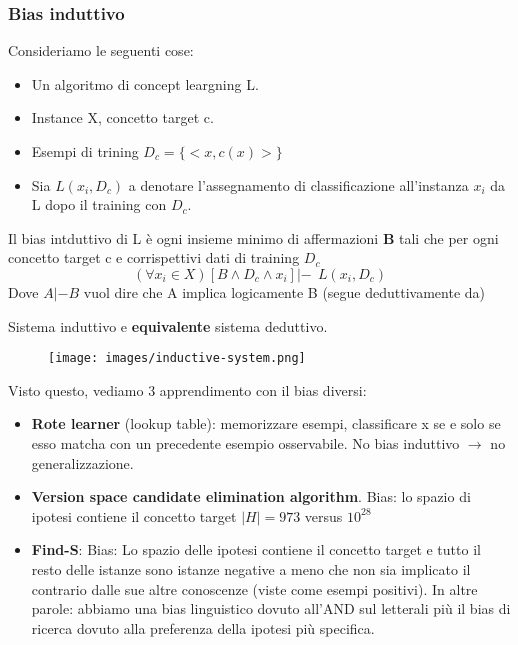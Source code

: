 \subsubsection{Bias induttivo}
Consideriamo le seguenti cose:
\begin{itemize}
    \item Un algoritmo di concept leargning L.
    \item Instance X, concetto target c.
    \item Esempi di trining $D_c = \{<x, c(x)>\}$
    \item Sia $L(x_i, D_c)$ a denotare l'assegnamento di classificazione all'instanza $x_i$ da L dopo il training con $D_c$.
\end{itemize}
\begin{definition}
    Il bias intduttivo di L è ogni insieme minimo di affermazioni \textbf{B} tali che per ogni concetto target c e corrispettivi dati di training $D_c$
    $$(\forall x_i \in X)[B \land D_c \land x_i] |- \:\: L(x_i, D_c)$$
    Dove $A |- B$ vuol dire che A implica logicamente B (segue deduttivamente da)
\end{definition}
\newpage
Sistema induttivo e \textbf{equivalente} sistema deduttivo.
\begin{figure}[h!]
    \centering
    \texttt{[image: images/inductive-system.png]}
\end{figure}
Visto questo, vediamo 3 apprendimento con il bias diversi:
\begin{itemize}
    \item \textbf{Rote learner} (lookup table): memorizzare esempi, classificare x se e solo se esso matcha con un precedente esempio osservabile. No bias induttivo $\to$ no generalizzazione.
    \item \textbf{Version space candidate elimination algorithm}. Bias: lo spazio di ipotesi contiene il concetto target $|H| = 973$ versus $10^{28}$
    \item \textbf{Find-S}: Bias: Lo spazio delle ipotesi contiene il concetto target e tutto il resto delle istanze sono istanze negative a meno che non sia implicato il contrario
    dalle sue altre conoscenze (viste come esempi positivi). In altre parole: abbiamo una bias linguistico dovuto all'AND sul
    letterali più il bias di ricerca dovuto alla preferenza della ipotesi più specifica.
\end{itemize}